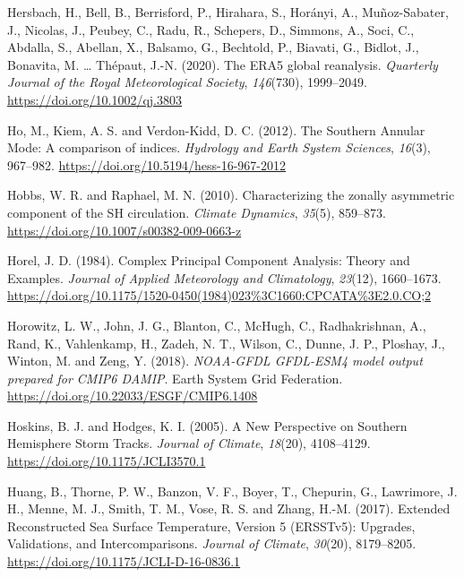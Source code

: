 \documentclass[12pt,oneside,a4paper]{reedthesis}
\newlength{\cslhangindent}
\newenvironment{CSLReferences}[2] %
 {%
  \setlength{\parindent}{0pt}
  \ifodd #1 \everypar{\setlength{\hangindent}{\cslhangindent}}\ignorespaces\fi
  \ifnum #2 > 0
  \setlength{\parskip}{#2\baselineskip}
  \fi
 }%
 {}
\begin{document}
\begin{CSLReferences}{1}{0}
\leavevmode{}%
Hersbach, H., Bell, B., Berrisford, P., Hirahara, S., Horányi, A., Muñoz-Sabater, J., Nicolas, J., Peubey, C., Radu, R., Schepers, D., Simmons, A., Soci, C., Abdalla, S., Abellan, X., Balsamo, G., Bechtold, P., Biavati, G., Bidlot, J., Bonavita, M. \ldots{} Thépaut, J.-N. (2020). The {ERA5} global reanalysis. \emph{Quarterly Journal of the Royal Meteorological Society}, \emph{146}(730), 1999--2049. \url{https://doi.org/10.1002/qj.3803}

\leavevmode{}%
Ho, M., Kiem, A. S. and Verdon-Kidd, D. C. (2012). The {Southern Annular Mode}: A comparison of indices. \emph{Hydrology and Earth System Sciences}, \emph{16}(3), 967--982. \url{https://doi.org/10.5194/hess-16-967-2012}

\leavevmode{}%
Hobbs, W. R. and Raphael, M. N. (2010). Characterizing the zonally asymmetric component of the {SH} circulation. \emph{Climate Dynamics}, \emph{35}(5), 859--873. \url{https://doi.org/10.1007/s00382-009-0663-z}

\leavevmode{}%
Horel, J. D. (1984). Complex {Principal Component Analysis}: {Theory} and {Examples}. \emph{Journal of Applied Meteorology and Climatology}, \emph{23}(12), 1660--1673. \url{https://doi.org/10.1175/1520-0450(1984)023\%3C1660:CPCATA\%3E2.0.CO;2}

\leavevmode{}%
Horowitz, L. W., John, J. G., Blanton, C., McHugh, C., Radhakrishnan, A., Rand, K., Vahlenkamp, H., Zadeh, N. T., Wilson, C., Dunne, J. P., Ploshay, J., Winton, M. and Zeng, Y. (2018). \emph{NOAA-GFDL GFDL-ESM4 model output prepared for CMIP6 DAMIP}. Earth System Grid Federation. \url{https://doi.org/10.22033/ESGF/CMIP6.1408}

\leavevmode{}%
Hoskins, B. J. and Hodges, K. I. (2005). A {New Perspective} on {Southern Hemisphere Storm Tracks}. \emph{Journal of Climate}, \emph{18}(20), 4108--4129. \url{https://doi.org/10.1175/JCLI3570.1}

\leavevmode{}%
Huang, B., Thorne, P. W., Banzon, V. F., Boyer, T., Chepurin, G., Lawrimore, J. H., Menne, M. J., Smith, T. M., Vose, R. S. and Zhang, H.-M. (2017). Extended {Reconstructed Sea Surface Temperature}, {Version} 5 ({ERSSTv5}): {Upgrades}, {Validations}, and {Intercomparisons}. \emph{Journal of Climate}, \emph{30}(20), 8179--8205. \url{https://doi.org/10.1175/JCLI-D-16-0836.1}


\end{CSLReferences}
\end{document}

